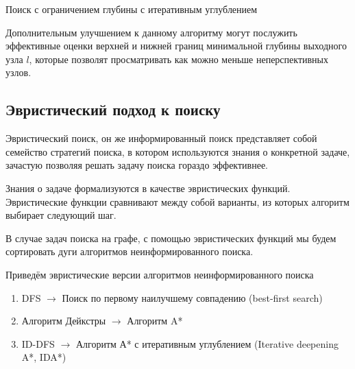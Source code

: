 \begin{algorithm}[H]
\SetAlgoLined
{}

\caption{Поиск с ограничением глубины с итеративным углублением} \label{algo:ID-DLS}
\end{algorithm}

Дополнительным улучшением к данному алгоритму могут послужить эффективные оценки верхней и нижней границ минимальной глубины выходного узла $l$, которые позволят просматривать как можно меньше неперспективных узлов.

\subsection{Эвристический подход к поиску} \label{sec:heuristics-intro}

Эвристический поиск, он же информированный поиск представляет собой семейство стратегий поиска,
в котором используются знания о конкретной задаче, зачастую позволяя решать задачу поиска гораздо эффективнее.

Знания о задаче формализуются в качестве эвристических функций.
Эвристические функции сравнивают между собой варианты, из которых алгоритм выбирает следующий шаг.

В случае задач поиска на графе, с помощью эвристических функций мы будем сортировать дуги алгоритмов неинформированного поиска.

Приведём эвристические версии алгоритмов неинформированного поиска
\begin{enumerate}
    \item DFS $\rightarrow$ Поиск по первому наилучшему совпадению (best-first search) \cite{Best-First-Search}
    \item Алгоритм Дейкстры $\rightarrow$ Алгоритм A* \cite{A-Star}
    \item ID-DFS $\rightarrow$ Алгоритм А* с итеративным углублением (Iterative deepening A*, IDA*) \cite{Korf-ID-DFS}
\end{enumerate}


